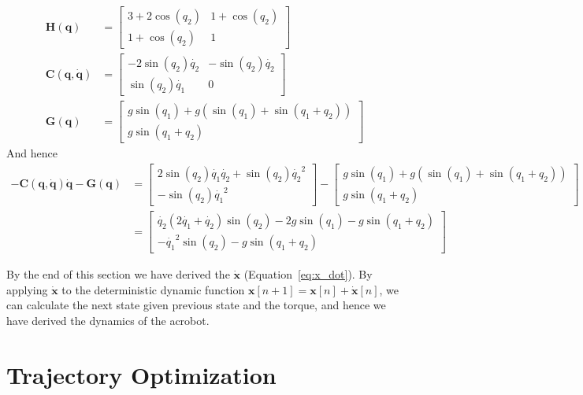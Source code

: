 \begin{align}
\mathbf{H(q)} &= \begin{bmatrix} 3+2\cos(q_2) & 1+\cos(q_2) \\ 1+\cos(q_2) & 1 \end{bmatrix} \nonumber \\
\mathbf{C(q,\dot{q})} &=\begin{bmatrix} -2\sin(q_2)\dot{q_2} & -\sin(q_2)\dot{q_2} \\ \sin(q_2)\dot{q_1} & 0 \end{bmatrix} \nonumber \\
\mathbf{G(q)} &=\begin{bmatrix} g\sin(q_1)+g(\sin(q_1)+\sin(q_1+q_2)) \\ g\sin(q_1+q_2) \end{bmatrix} \nonumber
\end{align}
And hence
\begin{align}
\mathbf{-C(q,\dot{q})\dot{q}-G(q) } &= \begin{bmatrix} 2\sin(q_2)\dot{q_1}\dot{q_2}+\sin(q_2)\dot{q_2}^2 \\ -\sin(q_2)\dot{q_1}^2 \end{bmatrix}-\begin{bmatrix} g\sin(q_1)+g(\sin(q_1)+\sin(q_1+q_2)) \\ g\sin(q_1+q_2) \end{bmatrix} \nonumber \\
&=  \begin{bmatrix} \dot{q_2}(2\dot{q_1}+\dot{q_2})\sin(q_2)-2g \sin(q_1)-g\sin(q_1+q_2) \\ -\dot{q_1}^2\sin(q_2)-g\sin(q_1+q_2) \end{bmatrix} \nonumber
\end{align}

By the end of this section we have derived the $\mathbf{\dot{x}}$ (Equation~\ref{eq:x_dot}). By applying $\mathbf{\dot{x}}$ to the deterministic dynamic function $\mathbf x[n+1] = \mathbf x[n] + \mathbf {\dot{x}}[n]$, we can calculate the next state given previous state and the torque, and hence we have derived the dynamics of the acrobot.

\section{Trajectory Optimization} \label{Optimization}
